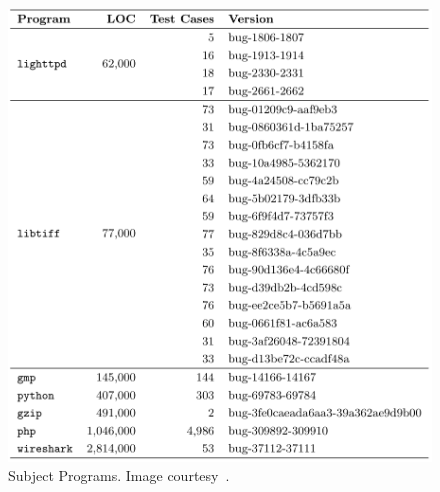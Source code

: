 \begin{figure}[bt!]
\centering
\includegraphics[width=\linewidth]{datasets.png}
\caption{Subject Programs. Image courtesy~\cite{qi2014}.}
\label{fig:datasets}
\end{figure}